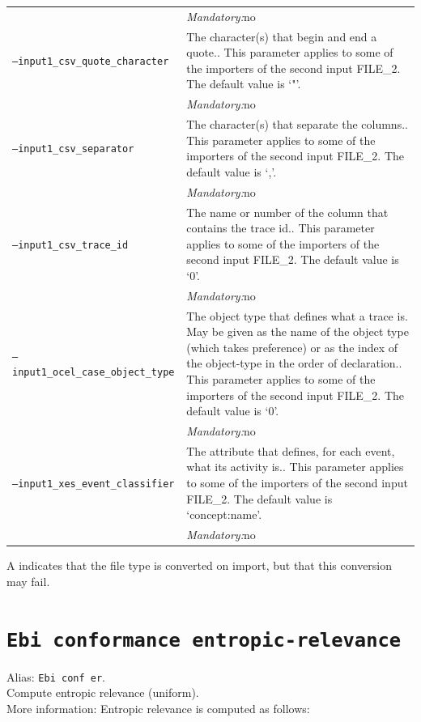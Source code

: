 {\begin{tabularx}{\linewidth}{lX}
&\textit{Mandatory:}\quad no\\
\texttt{--input1\_csv\_quote\_character} & The character(s) that begin and end a quote.. This parameter applies to some of the importers of the second input FILE\_2. The default value is `"'.\\
&\textit{Mandatory:}\quad no\\
\texttt{--input1\_csv\_separator} & The character(s) that separate the columns.. This parameter applies to some of the importers of the second input FILE\_2. The default value is `,'.\\
&\textit{Mandatory:}\quad no\\
\texttt{--input1\_csv\_trace\_id} & The name or number of the column that contains the trace id.. This parameter applies to some of the importers of the second input FILE\_2. The default value is `0'.\\
&\textit{Mandatory:}\quad no\\
\texttt{--input1\_ocel\_case\_object\_type} & The object type that defines what a trace is. May be given as the name of the object type (which takes preference) or as the index of the object-type in the order of declaration.. This parameter applies to some of the importers of the second input FILE\_2. The default value is `0'.\\
&\textit{Mandatory:}\quad no\\
\texttt{--input1\_xes\_event\_classifier} & The attribute that defines, for each event, what its activity is.. This parameter applies to some of the importers of the second input FILE\_2. The default value is `concept:name'.\\
&\textit{Mandatory:}\quad no\\
\bottomrule
\end{tabularx}
A \textdagger{} indicates that the file type is converted on import, but that this conversion may fail.
\clearpage\section{\texttt{Ebi conformance entropic-relevance}}
\label{command:Ebi conformance entropic-relevance}
Alias: \texttt{Ebi conf er}.\\
Compute entropic relevance (uniform).\\
More information: Entropic relevance is computed as follows:
        
}
